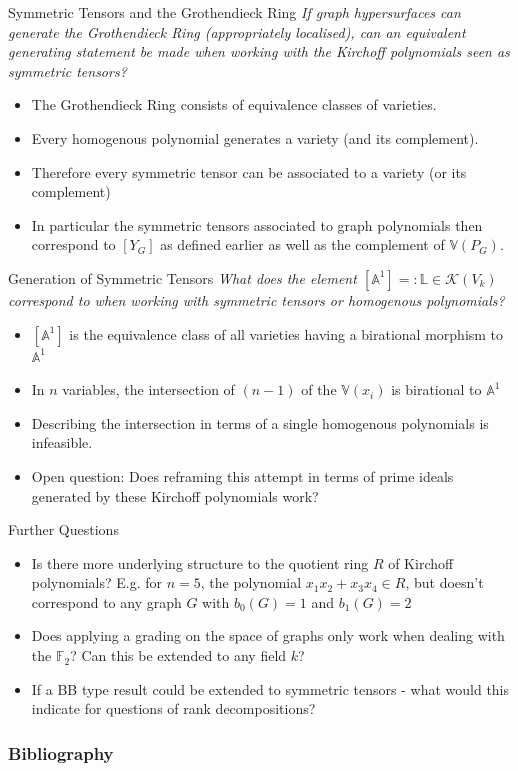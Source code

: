 \documentclass{beamer}
\def\field{\mathbb{F}} %
\begin{document}
\begin{frame}{Symmetric Tensors and the Grothendieck Ring}
    \textit{If graph hypersurfaces can generate the Grothendieck Ring (appropriately localised), can an equivalent generating statement be made when working with the Kirchoff polynomials seen as symmetric tensors?} \pause
    \begin{itemize}
        \item<1-> The Grothendieck Ring consists of equivalence classes of varieties.
        \item<2-> Every homogenous polynomial generates a variety (and its complement). %
        \item<3-> Therefore every symmetric tensor can be associated to a variety (or its complement)
        \item<4-> In particular the symmetric tensors associated to graph polynomials then correspond to $[Y_G]$ as defined earlier as well as the complement of $\mathbb{V}(P_G)$.
    \end{itemize}
\end{frame}
\begin{frame}{Generation of Symmetric Tensors}
    \textit{What does the element $[\mathbb{A}^1] =: \mathbb{L} \in \mathcal{K}(V_k)$ correspond to when working with symmetric tensors or homogenous polynomials?}
    \begin{itemize}
        \item<1-> $[\mathbb{A}^1]$ is the equivalence class of all varieties having a birational morphism to $\mathbb{A}^1$
        \item<2-> In $n$ variables, the intersection of $(n-1)$ of the $\mathbb{V}(x_i)$ is birational to $\mathbb{A}^1$ 
        \item<3-> Describing the intersection in terms of a single homogenous polynomials is infeasible. 
        \item<4-> Open question: Does reframing this attempt in terms of prime ideals generated by these Kirchoff polynomials work?
    \end{itemize}
\end{frame}
\begin{frame}{Further Questions}
    \begin{itemize}
        \item<1-> Is there more underlying structure to the quotient ring $R$ of Kirchoff polynomials? E.g. for $n = 5$, the polynomial $x_1x_2 + x_3x_4 \in R$, but doesn't correspond to any graph $G$ with $b_0(G) = 1$ and $b_1(G) = 2$
        \item<2-> Does applying a grading on the space of graphs only work when dealing with the $\field_2$? Can this be extended to any field $k$?
        \item<3-> If a BB type result could be extended to symmetric tensors - what would this indicate for questions of rank decompositions? 
    \end{itemize}
\end{frame}
\begin{frame}[allowframebreaks]
    \frametitle{Bibliography}
    

\end{frame}
\end{document}
